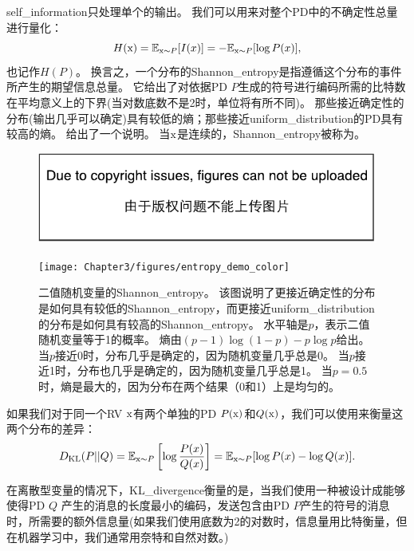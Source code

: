 \gls{self_information}只处理单个的输出。
我们可以用来对整个\gls{PD}中的不确定性总量进行量化：
\begin{equation}
H(\mathrm{x}) = \mathbb{E}_{\mathrm{x} \sim P}[I(x)] = -\mathbb{E}_{\mathrm{x} \sim P}[\log P(x)],
\end{equation}
也记作$H(P)$。
换言之，一个分布的\gls{Shannon_entropy}是指遵循这个分布的事件所产生的期望信息总量。
它给出了对依据\gls{PD} $P$生成的符号进行编码所需的比特数在平均意义上的下界(当对数底数不是2时，单位将有所不同)。
那些接近确定性的分布(输出几乎可以确定)具有较低的熵；那些接近\gls{uniform_distribution}的\gls{PD}具有较高的熵。
给出了一个说明。
当$\mathrm{x}$是连续的，\gls{Shannon_entropy}被称为。
\begin{figure}[!htb]
\ifOpenSource
\centerline{\includegraphics{figure.pdf}}
\else
\centerline{\texttt{[image: Chapter3/figures/entropy\_demo\_color]}}
\fi
\captionsetup{singlelinecheck=off}
\caption{二值随机变量的\gls{Shannon_entropy}。%
该图说明了更接近确定性的分布是如何具有较低的\gls{Shannon_entropy}，而更接近\gls{uniform_distribution}的分布是如何具有较高的\gls{Shannon_entropy}。
水平轴是$p$，表示二值随机变量等于1的概率。
熵由$(p-1)\log(1-p) - p\log p$给出。
当$p$接近0时，分布几乎是确定的，因为随机变量几乎总是0。
当$p$接近1时，分布也几乎是确定的，因为随机变量几乎总是1。
当$p = 0.5$时，熵是最大的，因为分布在两个结果（0和1）上是均匀的。}
\label{fig:chap3_entropy_demo_color}
\end{figure}



如果我们对于同一个\gls{RV} $\mathrm{x}$有两个单独的\gls{PD} $P(\mathrm{x})$和$Q(\mathrm{x})$，我们可以使用来衡量这两个分布的差异：
\begin{equation}
D_{\text{KL}}(P||Q) = \mathbb{E}_{\mathrm{x} \sim P} \left [  \log \frac{P(x)}{Q(x)} \right ] = \mathbb{E}_{\mathrm{x} \sim P} [\log P(x) - \log Q(x)].
\end{equation}

在离散型变量的情况下，\gls{KL_divergence}衡量的是，当我们使用一种被设计成能够使得\gls{PD} $Q$ 产生的消息的长度最小的编码，发送包含由\gls{PD} $P$产生的符号的消息时，所需要的额外信息量(如果我们使用底数为2的对数时，信息量用比特衡量，但在机器学习中，我们通常用奈特和自然对数。)

